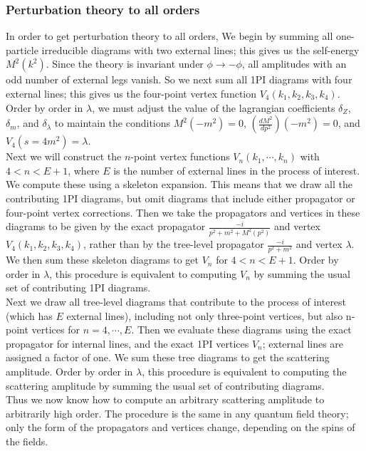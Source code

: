 \documentclass{article}
\begin{document}
\subsubsection{Perturbation theory to all orders}
In order to get perturbation theory to all orders, We begin by summing all one-particle irreducible diagrams with two external lines; this gives us the self-energy $M^2(k^2)$. Since the theory is invariant under $\phi \to -\phi$, all amplitudes with an odd number of external legs vanish. So we next sum all 1PI diagrams with four external lines; this gives us the four-point vertex function $V_4(k_1, k_2, k_3,k_4)$. Order by order in $\lambda$, we must adjust the value of the lagrangian coefficients $\delta_Z$, $\delta_m$, and $\delta_{\lambda}$ to maintain the conditions $M^2(-m^2)=0$, $(\frac{d M^2}{d p^2})(-m^2)=0$, and $V_4(s=4m^2)=\lambda$.\\
Next we will construct the $n$-point vertex functions $V_n(k_1,\cdots,k_n)$ with $4 < n < E+1$, where $E$ is the number of external lines in the process of interest. We compute these using a skeleton expansion. This means that we draw all
the contributing 1PI diagrams, but omit diagrams that include either propagator or four-point vertex corrections. Then we take the propagators and vertices in these diagrams to be given by the exact propagator $\frac{-i}{p^2+m^2+M^2(p^2)}$ and vertex $V_4(k_1, k_2, k_3,k_4)$, rather than by the tree-level propagator $\frac{-i}{p^2+m^2}$ and vertex $\lambda$. We then sum these skeleton diagrams to get $V_n$ for $4 < n < E+1$. Order by order in $\lambda$, this procedure is equivalent to computing $V_n$ by summing the usual set of contributing 1PI diagrams.\\
Next we draw all tree-level diagrams that contribute to the process of interest (which has $E$ external lines), including not only three-point vertices, but also n-point vertices for $n = 4,\cdots, E$. Then we evaluate these diagrams using the exact propagator for internal lines, and the exact 1PI vertices $V_n$; external lines are assigned a factor of one. We sum these tree diagrams to get the scattering amplitude. Order by order in $\lambda$, this procedure is equivalent to computing the scattering amplitude by summing the usual set of contributing diagrams.\\
Thus we now know how to compute an arbitrary scattering amplitude
to arbitrarily high order. The procedure is the same in any quantum field theory; only the form of the propagators and vertices change, depending on the spins of the fields.
\end{document}
